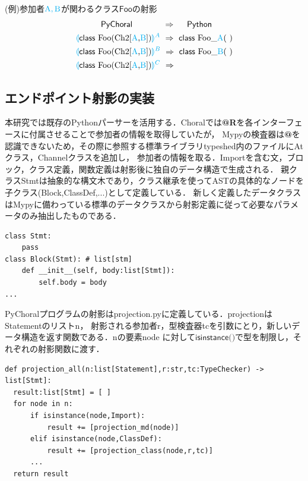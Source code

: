 \documentclass{resume}
\newcommand{\projection}[2]{{\color{cyan}\llparenthesis}#1{\color{cyan}\rrparenthesis^#2}}
\newcommand{\mblue}[1]{\textbf{\textsf{\color{MidnightBlue}#1}}}
\newcommand{\cyan}[1]{\color{cyan}#1}
\begin{document}
%
(例)参加者$\cyan{\text{A}},\cyan{\text{B}}$が関わるクラス$\textsf{Foo}$の射影
\begin{alignat*}{2} 
  &~~~~~~~~~\textsf{PyChoral} ~~~~~~~~~~~\Rightarrow~~~~ \textsf{Python}\\
  &\projection{\textsf{class} ~\text{Foo} \text{(Ch2[{\cyan{A}},{\cyan{B}}])}}{A} ~\Rightarrow~ \textsf{class} ~\text{Foo\_{\cyan{A}}}(~)\\
  &\projection{\textsf{class} ~\text{Foo} \text{(Ch2[{\cyan{A}},{\cyan{B}}])}}{B} ~\Rightarrow~ \textsf{class} ~\text{Foo\_{\cyan{B}}}(~)\\
  &\projection{\textsf{class} ~\text{Foo} \text{(Ch2[{\cyan{A}},{\cyan{B}}])}}{C} ~\Rightarrow~ 
\end{alignat*}
\subsection{エンドポイント射影の実装}
本研究では既存のPythonパーサーを活用する．Choralでは\mblue{@R}を各インターフェースに付属させることで参加者の情報を取得していたが，
Mypyの検査器は\mblue{@}を認識できないため，その際に参照する標準ライブラリ\textsf{typeshed}内のファイルにAtクラス，Channelクラスを追加し，
参加者の情報を取る．Importを含む文，ブロック，クラス定義，関数定義は射影後に独自のデータ構造で生成される．
親クラス\textsf{Stmt}は抽象的な構文木であり，クラス継承を使ってASTの具体的なノードを子クラス(\textsf{Block,ClassDef,...})として定義している．
新しく定義したデータクラスはMypyに備わっている標準のデータクラスから射影定義に従って必要なパラメータのみ抽出したものである．
\begin{lstlisting}[caption=data.py,label=data]
class Stmt:
    pass
class Block(Stmt): # list[stm]
    def __init__(self, body:list[Stmt]):
        self.body = body
... 
\end{lstlisting}
PyChoralプログラムの射影は\textsf{projection.py}に定義している．\textsf{projection}はStatementのリスト\textsf{n}，
射影される参加者\textsf{r}，型検査器\textsf{tc}を引数にとり，新しいデータ構造を返す関数である．\textsf{n}の要素\textsf{node}
に対して$\textsf{isinstance()}$で型を制限し，それぞれの射影関数に渡す．

\begin{lstlisting}[caption=projection.py,label=data]
def projection_all(n:list[Statement],r:str,tc:TypeChecker) -> list[Stmt]:
  result:list[Stmt] = [ ]
  for node in n:
      if isinstance(node,Import):
          result += [projection_md(node)]
      elif isinstance(node,ClassDef):
          result += [projection_class(node,r,tc)]
      ...
  return result
\end{lstlisting}
\end{document}
